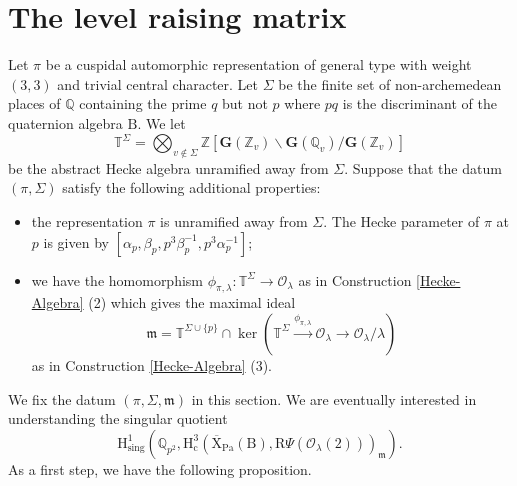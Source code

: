 \documentclass[10pt]{amsart}
\numberwithin{equation}{section}
\theoremstyle{definition}
\def\Coker{\mathrm{Coker}}
\def\Pa{\mathrm{Pa}}
\def\calO{\mathcal{O}}
\def\fracm{\mathfrak{m}}
\def\bfG{\mathbf{G}}
\def\QQ{\mathbb{Q}}
\def\TT{\mathbb{T}}
\def\ZZ{\mathbb{Z}}
\def\rmB{\mathrm{B}}
\def\rmF{\mathrm{F}}
\def\rmH{\mathrm{H}}
\def\rmI{\mathrm{I}}
\def\rmN{\mathrm{N}}
\def\rmR{\mathrm{R}}
\def\rmX{\mathrm{X}}
\begin{document}
\section{The level raising matrix}
Let $\pi$ be a cuspidal automorphic representation of general type with weight $(3, 3)$ and trivial central character.
Let $\Sigma$ be the finite set of non-archemedean places of $\QQ$ containing the prime $q$ but not $p$ where $pq$ is the discriminant of the quaternion algebra $\rmB$.  We let 
\begin{equation*}
\TT^{\Sigma}=\bigotimes_{v\not\in \Sigma}\ZZ[\bfG(\ZZ_{v})\backslash\bfG(\QQ_{v})/\bfG(\ZZ_{v})]
\end{equation*}
be the abstract Hecke algebra unramified away from $\Sigma$. Suppose that the datum $(\pi, \Sigma)$ satisfy the following additional properties:
\begin{itemize}
\item the representation $\pi$ is unramified away from $\Sigma$. The Hecke parameter of $\pi$ at $p$ is given by $[\alpha_{p}, \beta_{p}, p^{3}\beta^{-1}_{p}, p^{3}\alpha^{-1}_{p}]$;
\item we have the homomorphism ${\phi}_{\pi, \lambda}: \TT^{\Sigma}\rightarrow \calO_{\lambda}$ as in Construction \ref{Hecke-Algebra} (2) which gives the maximal ideal 
\begin{equation*}
\fracm=\TT^{\Sigma\cup\{p\}}\cap \ker(\TT^{\Sigma}\xrightarrow{\phi_{\pi,\lambda}}\calO_{\lambda}\rightarrow\calO_{\lambda}/\lambda) 
\end{equation*}
as in Construction \ref{Hecke-Algebra} (3).
\end{itemize}
We fix the datum $(\pi, \Sigma, \fracm)$ in this section. We are eventually interested in understanding the singular quotient 
\begin{equation*}
\rmH^{1}_{\mathrm{sing}}(\QQ_{p^{2}},  \rmH^{3}_{\mathrm{c}}(\overline{\rmX}_{\Pa}(\rmB), \rmR\Psi(\calO_{\lambda}(2)))_{\fracm}).
\end{equation*}
As a first step, we have the following proposition.
\end{document}
